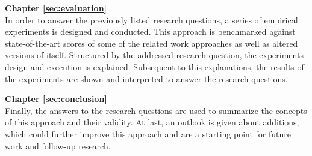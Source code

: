 \textbf{Chapter \ref{sec:evaluation}} \\[0.2em]
In order to answer the previously listed research questions, a series of empirical experiments is designed and conducted.\newline
This approach is benchmarked against state-of-the-art scores of some of the related work approaches as well as altered versions of itself.
Structured by the addressed research question, the experiments design and execution is explained.
Subsequent to this explanations, the results of the experiments are shown and interpreted to answer the research questions.

\textbf{Chapter \ref{sec:conclusion}} \\[0.2em]
Finally, the answers to the research questions are used to summarize the concepts of this approach and their validity.
At last, an outlook is given about additions, which could further improve this approach and are a starting point for future work and follow-up research.
